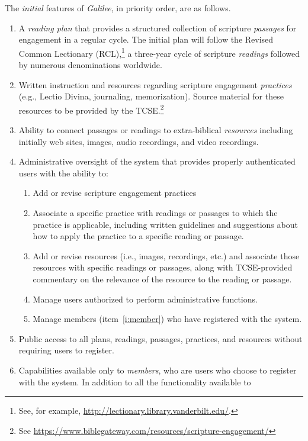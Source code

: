 \documentclass{article}
\newcommand{\gal}{\emph{Galilee}}
\newcommand{\tcse}{TCSE}
\begin{document}
The \emph{initial} features of \gal,
in priority order, are as follows.
\begin{enumerate}
\item A \emph{reading plan}
  that provides a structured collection of scripture \emph{passages}
  for engagement in a regular cycle.
  The initial plan will follow the Revised Common Lectionary
  (RCL),\footnote{See, for example, \url{http://lectionary.library.vanderbilt.edu/}.}
  a three-year cycle of scripture \emph{readings}
  followed by numerous denominations worldwide.
\item Written instruction and resources
  regarding scripture engagement \emph{practices}
  (e.g., Lectio Divina, journaling, memorization).
  Source material for these resources to be
  provided by
  the \tcse.\footnote{See \url{https://www.biblegateway.com/resources/scripture-engagement/}}
\item Ability to connect passages or readings
  to extra-biblical \emph{resources} including initially
  web sites,
  images,
  audio recordings,
  and video recordings.
\item Administrative oversight of the system
  that provides properly authenticated users
  with the ability to:
  \begin{enumerate}
  \item Add or revise scripture engagement practices
  \item Associate a specific practice with readings or passages
    to which the practice is applicable,
    including written guidelines and suggestions
    about how to apply the practice to a specific reading or passage.
  \item Add or revise resources (i.e., images, recordings, etc.)
    and associate those resources with specific readings or passages,
    along with \tcse-provided commentary on the relevance of the resource
    to the reading or passage.
  \item Manage users authorized to perform administrative functions.
  \item Manage members (item~\ref{i:member})
    who have registered with the system.
  \end{enumerate}
\item Public access to all plans, readings, passages, practices, and resources
  without requiring users to register.
\item\label{i:member} Capabilities available only to \emph{members},
  who are users who choose to register with the system.
  In addition to all the functionality available to

\end{enumerate}
\end{document}
